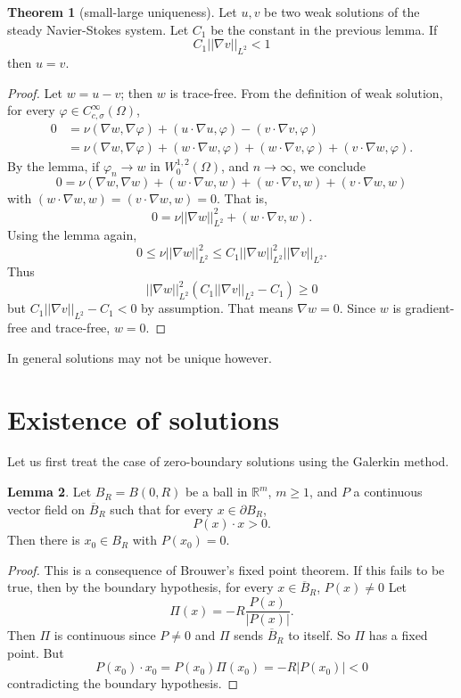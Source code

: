 \documentclass[12pt]{book}
\newcommand{\RR}{\mathbb{R}}
\theoremstyle{definition}
\newtheorem{theorem}{Theorem}[chapter]
\newtheorem{lemma}[theorem]{Lemma}
\begin{document}
\begin{theorem}[small-large uniqueness]
Let $u,v$ be two weak solutions of the steady Navier-Stokes system.
Let $C_1$ be the constant in the previous lemma. If
$$C_1 ||\nabla v||_{L^2} < 1$$
then $u = v$.
\end{theorem}
\begin{proof}
Let $w = u - v$; then $w$ is trace-free. From the definition of weak solution, for every $\varphi \in C^\infty_{c,\sigma}(\Omega)$,
\begin{align*}
0 &= \nu(\nabla w, \nabla \varphi) + (u \cdot \nabla u, \varphi) - (v \cdot \nabla v, \varphi)\\
&= \nu(\nabla w, \nabla \varphi) + (w \cdot \nabla w, \varphi) + (w \cdot \nabla v, \varphi) + (v \cdot \nabla w, \varphi).
\end{align*}
By the lemma, if $\varphi_n \to w$ in $W^{1,2}_0(\Omega)$, and $n \to \infty$, we conclude
$$0 = \nu(\nabla w, \nabla w) + (w \cdot \nabla w, w) + (w \cdot \nabla v, w) + (v \cdot \nabla w, w)$$
with $(w \cdot \nabla w, w) = (v \cdot \nabla w, w) = 0$. That is,
$$0 = \nu||\nabla w||_{L^2}^2 + (w \cdot \nabla v, w).$$
Using the lemma again,
$$0 \leq \nu ||\nabla w||_{L^2}^2 \leq C_1 ||\nabla w||_{L^2}^2 ||\nabla v||_{L^2}.$$
Thus
$$||\nabla w||_{L^2}^2(C_1||\nabla v||_{L^2} - C_1) \geq 0$$
but $C_1||\nabla v||_{L^2} - C_1 < 0$ by assumption. That means $\nabla w = 0$.
Since $w$ is gradient-free and trace-free, $w = 0$.
\end{proof}

In general solutions may not be unique however.

\section{Existence of solutions}
Let us first treat the case of zero-boundary solutions using the Galerkin method.

\begin{lemma}
Let $B_R = B(0, R)$ be a ball in $\RR^m$, $m \geq 1$, and $P$ a continuous vector field on $\overline B_R$ such that for every $x \in \partial B_R$,
$$P(x) \cdot x > 0.$$
Then there is $x_0 \in B_R$ with $P(x_0) = 0$.
\end{lemma}
\begin{proof}
This is a consequence of Brouwer's fixed point theorem.
If this fails to be true, then by the boundary hypothesis, for every $x \in \overline B_R$, $P(x) \neq 0$
Let
$$\Pi(x) = -R\frac{P(x)}{|P(x)|}.$$
Then $\Pi$ is continuous since $P \neq 0$ and $\Pi$ sends $\overline B_R$ to itself.
So $\Pi$ has a fixed point. But
$$P(x_0) \cdot x_0 = P(x_0) \Pi(x_0) = -R|P(x_0)| < 0$$
contradicting the boundary hypothesis.
\end{proof}
\end{document}
